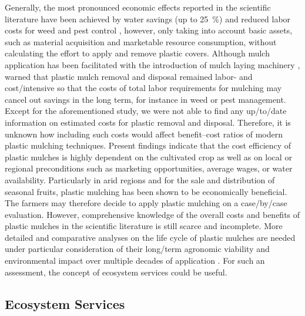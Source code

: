 Generally, the most pronounced economic effects reported in the scientific literature have been achieved by water savings (up to \SI{25}{\percent}) and reduced labor costs for weed and pest control \citep{IngmanAgricultural2015,JabranMulching2015}, however, only taking into account basic assets, such as material acquisition and marketable resource consumption, without calculating the effort to apply and remove plastic covers.
Although mulch application has been facilitated with the introduction of mulch laying machinery \citep{SinghMechanization2014}, \citet{SchonbeckWeed1999} warned that plastic mulch removal and disposal remained labor- and cost\-/intensive so that the costs of total labor requirements for mulching may cancel out savings in the long term, for instance in weed or pest management. Except for the aforementioned study, we were not able to find any up\-/to\-/date information on estimated costs for plastic removal and disposal. Therefore, it is unknown how including such costs would affect benefit--cost ratios of modern plastic mulching techniques.
Present findings indicate that the cost efficiency of plastic mulches is highly dependent on the cultivated crop as well as on local or regional preconditions such as marketing opportunities, average wages, or water availability. Particularly in arid regions and for the sale and distribution of seasonal fruits, plastic mulching has been shown to be economically beneficial. The farmers may therefore decide to apply plastic mulching on a case\-/by\-/case evaluation. However, comprehensive knowledge of the overall costs and benefits of plastic mulches in the scientific literature is still scarce and incomplete. More detailed and comparative analyses on the life cycle of plastic mulches are needed under particular consideration of their long\-/term agronomic viability and environmental impact over multiple decades of application \citep{AyalaPerspectives2002}. For such an assessment, the concept of ecosystem services could be useful.

\subsection{Ecosystem Services}

